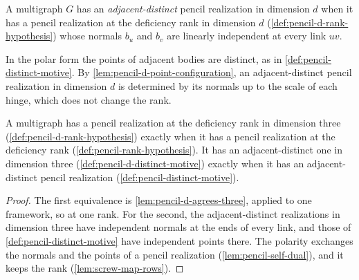 \begin{definition}
  \label{def:pencil-d-distinct-motive}
  \leanok
  A multigraph $G$ has an \emph{adjacent-distinct} pencil realization
  in dimension $d$ when it has a pencil realization at the deficiency
  rank in dimension $d$ (\cref{def:pencil-d-rank-hypothesis}) whose
  normals $b_u$ and $b_v$ are linearly independent at every link $uv$.
\end{definition}

In the polar form the points of adjacent bodies are distinct, as in
\cref{def:pencil-distinct-motive}. By
\cref{lem:pencil-d-point-configuration}, an adjacent-distinct pencil
realization in dimension $d$ is determined by its normals up to the
scale of each hinge, which does not change the rank.

\begin{lemma}
  \label{lem:pencil-d-rank-agrees-three}
  \leanok
  A multigraph has a pencil realization at the deficiency rank in
  dimension three (\cref{def:pencil-d-rank-hypothesis}) exactly when it
  has a pencil realization at the deficiency rank
  (\cref{def:pencil-rank-hypothesis}). It has an adjacent-distinct one
  in dimension three (\cref{def:pencil-d-distinct-motive}) exactly when
  it has an adjacent-distinct pencil realization
  (\cref{def:pencil-distinct-motive}).
\end{lemma}
\begin{proof}
  \leanok
  The first equivalence is \cref{lem:pencil-d-agrees-three}, applied to
  one framework, so at one rank. For the second, the adjacent-distinct
  realizations in dimension three have independent normals at the ends
  of every link, and those of \cref{def:pencil-distinct-motive} have
  independent points there. The polarity exchanges the normals and the
  points of a pencil realization (\cref{lem:pencil-self-dual}), and it
  keeps the rank (\cref{lem:screw-map-rows}).
\end{proof}

